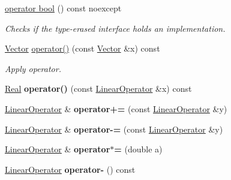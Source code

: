 \begin{DoxyCompactItemize}
\item 
\hyperlink{classSpacy_1_1LinearOperator_a48506fbca4e85aa239f80332cf6c37c1}{operator bool} () const noexcept
\begin{DoxyCompactList}\small\item\em Checks if the type-\/erased interface holds an implementation. \end{DoxyCompactList}\item 
\hyperlink{classSpacy_1_1Vector}{Vector} \hyperlink{classSpacy_1_1LinearOperator_a54d74eb77e706ee2e087a0363929e946}{operator()} (const \hyperlink{classSpacy_1_1Vector}{Vector} \&x) const \hypertarget{classSpacy_1_1LinearOperator_a54d74eb77e706ee2e087a0363929e946}{}\label{classSpacy_1_1LinearOperator_a54d74eb77e706ee2e087a0363929e946}

\begin{DoxyCompactList}\small\item\em Apply operator. \end{DoxyCompactList}\item 
\hyperlink{classSpacy_1_1Real}{Real} {\bfseries operator()} (const \hyperlink{classSpacy_1_1LinearOperator}{Linear\+Operator} \&x) const \hypertarget{classSpacy_1_1LinearOperator_a75400dbcfa651fed1b37f58a8e722b90}{}\label{classSpacy_1_1LinearOperator_a75400dbcfa651fed1b37f58a8e722b90}

\item 
\hyperlink{classSpacy_1_1LinearOperator}{Linear\+Operator} \& {\bfseries operator+=} (const \hyperlink{classSpacy_1_1LinearOperator}{Linear\+Operator} \&y)\hypertarget{classSpacy_1_1LinearOperator_a42c28cd0068a08b7547e44aa6ab4a4e7}{}\label{classSpacy_1_1LinearOperator_a42c28cd0068a08b7547e44aa6ab4a4e7}

\item 
\hyperlink{classSpacy_1_1LinearOperator}{Linear\+Operator} \& {\bfseries operator-\/=} (const \hyperlink{classSpacy_1_1LinearOperator}{Linear\+Operator} \&y)\hypertarget{classSpacy_1_1LinearOperator_a38f6913a360e69a37f32487044958262}{}\label{classSpacy_1_1LinearOperator_a38f6913a360e69a37f32487044958262}

\item 
\hyperlink{classSpacy_1_1LinearOperator}{Linear\+Operator} \& {\bfseries operator$\ast$=} (double a)\hypertarget{classSpacy_1_1LinearOperator_a1a337571a68b1c5ece14c637682ac8a4}{}\label{classSpacy_1_1LinearOperator_a1a337571a68b1c5ece14c637682ac8a4}

\item 
\hyperlink{classSpacy_1_1LinearOperator}{Linear\+Operator} {\bfseries operator-\/} () const \hypertarget{classSpacy_1_1LinearOperator_ac77bf18c27c54f2589cfd8ccd6e44dd9}{}\label{classSpacy_1_1LinearOperator_ac77bf18c27c54f2589cfd8ccd6e44dd9}


\end{DoxyCompactItemize}

